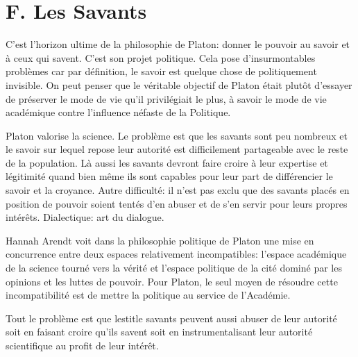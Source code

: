 \documentclass[12pt]{article}
\begin{document}
\section*{\color{red}F. Les Savants}
C'est l'horizon ultime de la philosophie de Platon: donner le pouvoir au savoir et à ceux qui savent.
C'est son projet politique.
Cela pose d'insurmontables problèmes car par définition, le savoir est quelque chose de politiquement invisible.
On peut penser que le véritable objectif de Platon était plutôt d'essayer de préserver le mode de vie qu'il privilégiait le plus, à savoir le mode de vie académique contre l'influence néfaste de la Politique.\par
Platon valorise la science.
Le problème est que les savants sont peu nombreux et le savoir sur lequel repose leur autorité est difficilement partageable avec le reste de la population.
Là aussi les savants devront faire croire à leur expertise et légitimité quand bien même ils sont capables pour leur part de différencier le savoir et la croyance.
Autre difficulté: il n'est pas exclu que des savants placés en position de pouvoir soient tentés d'en abuser et de s'en servir pour leurs propres intérêts.
\color{red}Dialectique: art du dialogue.\color{black}\par
Hannah Arendt voit dans la philosophie politique de Platon une mise en concurrence entre deux espaces relativement incompatibles: l'espace académique de la science tourné vers la vérité et l'espace politique de la cité dominé par les opinions et les luttes de pouvoir.
Pour Platon, le seul moyen de résoudre cette incompatibilité est de mettre la politique au service de l'Académie.\par
Tout le problème est que lestitle savants peuvent aussi abuser de leur autorité soit en faisant croire qu'ils savent soit en instrumentalisant leur autorité scientifique au profit de leur intérêt.
\pagebreak
\end{document}
